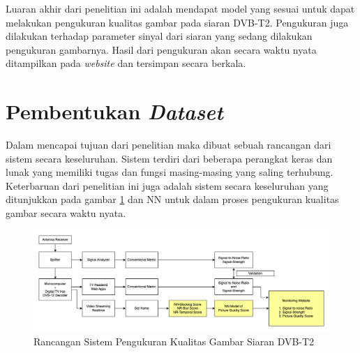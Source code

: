 Luaran akhir dari penelitian ini adalah mendapat model yang sesuai untuk dapat melakukan pengukuran kualitas gambar pada siaran DVB-T2. Pengukuran juga dilakukan terhadap parameter sinyal dari siaran yang sedang dilakukan pengukuran gambarnya. Hasil dari pengukuran akan secara waktu nyata ditampilkan pada \textit{website} dan tersimpan secara berkala.


\section{Pembentukan \textit{Dataset}}
\hspace{1.2cm}
Dalam mencapai tujuan  dari penelitian maka dibuat sebuah rancangan dari sistem secara keseluruhan. Sistem terdiri dari beberapa perangkat keras dan lunak yang memiliki tugas dan fungsi masing-masing yang saling terhubung. Keterbaruan dari penelitian ini juga adalah sistem secara keseluruhan yang ditunjukkan pada gambar \ref{rancangan-sistem} dan NN untuk dalam proses pengukuran kualitas gambar secara waktu nyata.

\begin{figure}[H]
	\vspace{-0.1cm}
	\begin{center}
		\includegraphics[width=1\columnwidth]{bab3/Gambar/rancangan-sistem.png}
	\end{center}
	\vspace{-0.2cm}
	\caption{Rancangan Sistem Pengukuran Kualitas Gambar Siaran DVB-T2} \label{rancangan-sistem}
\end{figure}

